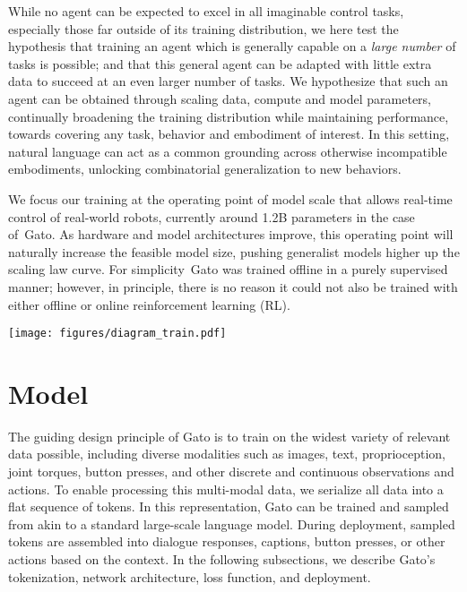 \documentclass[10pt]{article} \usepackage[accepted]{tmlr}
\newcommand{\model}{{Gato}}
\begin{document}
While no agent can be expected to excel in all imaginable control tasks, especially those far outside of its training distribution, we here test the hypothesis that training an agent which is generally capable on a \emph{large number} of tasks is possible; and that this general agent can be adapted with little extra data to succeed at an even larger number of tasks.
We hypothesize that such an agent can be obtained through scaling data, compute and model parameters, continually broadening the training distribution while maintaining performance, towards covering any task, behavior and embodiment of interest.
In this setting, natural language can act as a common grounding across otherwise incompatible embodiments, unlocking combinatorial generalization to new behaviors.


We focus our training at the operating point of model scale that allows real-time control of real-world robots, currently around 1.2B parameters in the case of~\model{}.
As hardware and model architectures improve, this operating point will naturally increase the feasible model size, pushing generalist models higher up the scaling law curve.
For simplicity~\model{} was trained offline in a purely supervised manner; however, in principle, there is no reason it could not also be trained with either offline or online reinforcement learning (RL). 


\begin{figure*}[t]
    \raggedleft
    \vskip 0.35cm
    \texttt{[image: figures/diagram\_train.pdf]}
    \vskip 0.35cm
    \caption{{\bf Training phase of \model{}}. Data from different tasks and modalities is serialized into a flat sequence of tokens, batched, and processed by a transformer neural network akin to a large language model. Masking is used such that the loss function is applied only to target outputs, i.e. text and various actions.}
    \label{fig:calm-diagram}
\end{figure*}

\section{Model}
\label{sec:model}


The guiding design principle of \model{} is to train on the widest variety of relevant data possible, including diverse modalities such as images, text, proprioception, joint torques, button presses, and other discrete and continuous observations and actions. 
To enable processing this multi-modal data, we serialize all data into a flat sequence of tokens.
In this representation, \model{} can be trained and sampled from akin to a standard large-scale language model.
During deployment, sampled tokens are assembled into dialogue responses, captions, button presses, or other actions based on the context.
In the following subsections, we describe \model{}'s tokenization, network architecture, loss function, and deployment.
\vskip 0.4cm
\end{document}
